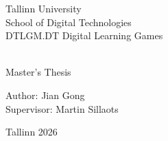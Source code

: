 
\begin{titlepage}
\thispagestyle{empty} 
\makeatletter
    \centering
    \vspace{2cm}
    {\large Tallinn University}\\
    \vspace{0.5cm}
    {\large School of Digital Technologies} \\
    \vspace{0.5cm}
    {\large DTLGM.DT Digital Learning Games}

    \vfill

    {\huge \textbf{ \@title}}\\
    \vspace{2cm}
    {\large Master's Thesis}

    \vfill
    \vfill

    \begin{flushright}
        {\large Author: Jian Gong } \\
        \vspace{0.3cm}
        {\large Supervisor: Martin Sillaots}
    \end{flushright}

    \vfill

    {\large Tallinn 2026}
\makeatother
\end{titlepage}